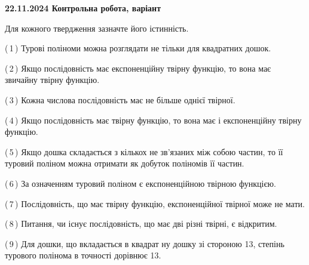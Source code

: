 \documentclass[12pt, ukrainian]{article}
\begin{document}
\begin {large}
\begin {large}
\begin {large}
\begin {large}
\begin {large}
\begin {large}
\begin {large}
\begin {large}
\begin {large}
\begin {large}
\begin {large}
\begin {large}
\begin {large}
\begin {large}
\begin {large}
\begin {large}
\begin {large}
\begin {large}
\begin {large}
\begin {large}
\begin {large}
\begin {large}
\begin {large}
\begin {large}
\begin {large}
\begin {large}
\begin {large}
\begin {large}
\begin {large}
\begin {large}
\begin {large}
\begin {large}
\begin {large}
\begin {large}
\begin {large}
\begin {large}
\begin {large}
\begin {large}
\begin {large}
\begin {large}
\begin {large}
\begin {large}
\begin {large}
\begin {large}
\begin {large}
\begin {large}
\begin {large}
\begin {large}
\begin {large}
\textbf{22.11.2024 Контрольна робота, варіант  }\par


{
Для кожного твердження зазначте його істинність.\par

\vspace{2mm}

(\,1\,) Турові поліноми можна розглядати не тільки для квадратних дошок.%



(\,2\,) Якщо послідовність має експоненційну твірну функцію, то вона має звичайну твірну функцію.%



(\,3\,) Кожна числова послідовність має не більше однієї твірної.%



(\,4\,) Якщо послідовність має твірну функцію, то вона має і експоненційну твірну функцію.%



(\,5\,) Якщо дошка складається з кількох не зв’язаних між собою частин, то її туровий поліном можна отримати як добуток поліномів її частин.%



(\,6\,) За означенням туровий поліном є експоненційною твірною функцією.%



(\,7\,) Послідовність, що має твірну функцію, експоненційної твірної може не мати.%



(\,8\,) Питання, чи існує послідовність, що має дві різні твірні, є відкритим.%



(\,9\,) Для дошки, що вкладається в квадрат ну дошку зі стороною 13, степінь турового полінома в точності дорівнює 13.%



}
\end{large}
\end{large}
\end{large}
\end{large}
\end{large}
\end{large}
\end{large}
\end{large}
\end{large}
\end{large}
\end{large}
\end{large}
\end{large}
\end{large}
\end{large}
\end{large}
\end{large}
\end{large}
\end{large}
\end{large}
\end{large}
\end{large}
\end{large}
\end{large}
\end{large}
\end{large}
\end{large}
\end{large}
\end{large}
\end{large}
\end{large}
\end{large}
\end{large}
\end{large}
\end{large}
\end{large}
\end{large}
\end{large}
\end{large}
\end{large}
\end{large}
\end{large}
\end{large}
\end{large}
\end{large}
\end{large}
\end{large}
\end{large}
\end{large}
\end{document}
